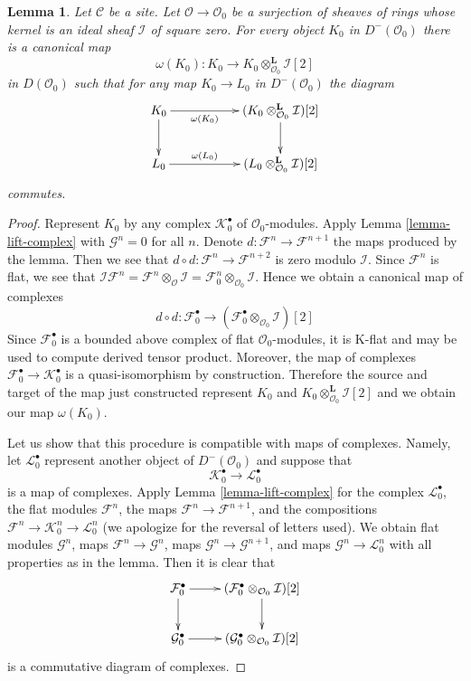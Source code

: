 \documentclass[10pt,a4paper]{amsart}
\theoremstyle{plain}
\newtheorem{lemma}[subsection]{Lemma}
\theoremstyle{definition}
\theoremstyle{remark}
\numberwithin{equation}{subsection}
\begin{document}
\begin{lemma}
\label{lemma-canonical-class}
Let $\mathcal{C}$ be a site. Let $\mathcal{O} \to \mathcal{O}_0$
be a surjection of sheaves of rings whose kernel is an ideal sheaf
$\mathcal{I}$ of square zero. For every object
$K_0$ in $D^-(\mathcal{O}_0)$ there is a canonical map
$$
\omega(K_0) :
K_0 \longrightarrow
K_0 \otimes_{\mathcal{O}_0}^\mathbf{L} \mathcal{I}[2]
$$
in $D(\mathcal{O}_0)$ such that for any map
$K_0 \to L_0$ in $D^-(\mathcal{O}_0)$ the diagram
$$
\xymatrix{
K_0 \ar[d] \ar[rr]_-{\omega(K_0)} & &
(K_0 \otimes^\mathbf{L}_{\mathcal{O}_0} \mathcal{I})[2] \ar[d] \\
L_0 \ar[rr]^-{\omega(L_0)} & &
(L_0 \otimes^\mathbf{L}_{\mathcal{O}_0} \mathcal{I})[2]
}
$$
commutes.
\end{lemma}

\begin{proof}
Represent $K_0$ by any complex
$\mathcal{K}_0^\bullet$ of $\mathcal{O}_0$-modules.
Apply Lemma \ref{lemma-lift-complex}
with $\mathcal{G}^n = 0$ for all $n$.
Denote $d : \mathcal{F}^n \to \mathcal{F}^{n + 1}$
the maps produced by the lemma. Then we see that
$d \circ d : \mathcal{F}^n \to \mathcal{F}^{n + 2}$
is zero modulo $\mathcal{I}$. Since $\mathcal{F}^n$ is flat,
we see that
$\mathcal{I}\mathcal{F}^n =
\mathcal{F}^n \otimes_{\mathcal{O}} \mathcal{I} =
\mathcal{F}^n_0 \otimes_{\mathcal{O}_0} \mathcal{I}$.
Hence we obtain a canonical map of complexes
$$
d \circ d : \mathcal{F}_0^\bullet
\longrightarrow
(\mathcal{F}_0^\bullet \otimes_{\mathcal{O}_0} \mathcal{I})[2]
$$
Since $\mathcal{F}_0^\bullet$ is a bounded above complex
of flat $\mathcal{O}_0$-modules, it is K-flat and may be used
to compute derived tensor product. Moreover, the map of
complexes $\mathcal{F}_0^\bullet \to \mathcal{K}_0^\bullet$
is a quasi-isomorphism by construction. Therefore the source and
target of the map just constructed represent $K_0$ and
$K_0 \otimes_{\mathcal{O}_0}^\mathbf{L} \mathcal{I}[2]$
and we obtain our map $\omega(K_0)$.

\medskip\noindent
Let us show that this procedure is compatible with maps of complexes.
Namely, let $\mathcal{L}_0^\bullet$ represent another object of
$D^-(\mathcal{O}_0)$ and suppose that
$$
\mathcal{K}_0^\bullet \longrightarrow \mathcal{L}_0^\bullet
$$
is a map of complexes. Apply Lemma \ref{lemma-lift-complex}
for the complex $\mathcal{L}_0^\bullet$, the flat modules
$\mathcal{F}^n$, the maps $\mathcal{F}^n \to \mathcal{F}^{n + 1}$,
and the compositions
$\mathcal{F}^n \to \mathcal{K}_0^n \to \mathcal{L}_0^n$
(we apologize for the reversal of letters used).
We obtain flat modules $\mathcal{G}^n$, maps
$\mathcal{F}^n \to \mathcal{G}^n$, maps
$\mathcal{G}^n \to \mathcal{G}^{n + 1}$, and maps
$\mathcal{G}^n \to \mathcal{L}_0^n$ with all properties
as in the lemma. Then it is clear that
$$
\xymatrix{
\mathcal{F}_0^\bullet \ar[d] \ar[r] &
(\mathcal{F}_0^\bullet \otimes_{\mathcal{O}_0} \mathcal{I})[2] \ar[d] \\
\mathcal{G}_0^\bullet \ar[r] &
(\mathcal{G}_0^\bullet \otimes_{\mathcal{O}_0} \mathcal{I})[2]
}
$$
is a commutative diagram of complexes.


\end{proof}
\end{document}
